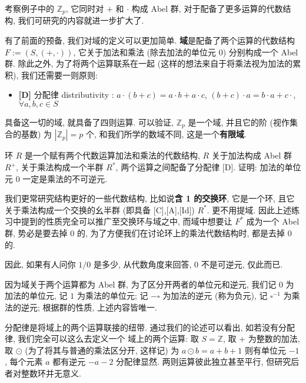 \documentclass[UTF8]{book}
\begin{document}
考察例子中的 $\mathbb{Z}_p$, 它同时对 $+$ 和 $\cdot$ 构成 
Abel 群, 对于配备了更多运算的代数结构, 
我们可研究的内容就进一步扩大了. 

有了前面的预备, 我们对域的定义可以更加简单. 
\textbf{域}是配备了两个运算的代数结构 $F := (S,(+,\cdot))$, 
它关于加法和乘法 (除去加法的单位元 0) 分别构成一个 Abel 群. 
除此之外, 为了将两个运算联系在一起 (这样的想法来自于将乘法视为加法的累积), 
我们还需要一则原则: 
\begin{itemize}
    \item \textbf{[D]} 分配律 distributivity : 
    $ a \cdot (b+c) = a \cdot b + a \cdot c$, 
    $ (b+c) \cdot a = b \cdot a + c \cdot $, 
    $ \forall a,b,c \in S$ 
\end{itemize}
具备这一切的域, 就具备了四则运算. 
可以验证, $\mathbb{Z}_p$ 是一个域, 
并且它的阶 (视作集合的基数) 为 $|\mathbb{Z}_p|=p$ 个, 
和我们所学的数域不同, 这是一个\textbf{有限域}. 

\begin{exercise}
    环 $R$ 是一个赋有两个代数运算加法和乘法的代数结构, 
    $R$ 关于加法构成 Abel 群 $R^+$, 
    关于乘法构成一个半群 $R^*$, 
    两个运算之间配备了分配律 [D]. 
    证明: 加法的单位元 $0$ 一定是乘法的不可逆元. 
\end{exercise}

我们更常研究结构更好的一些代数结构, 
比如说\textbf{含 1 的交换环}, 
它是一个环, 且它关于乘法构成一个交换的幺半群 
(即具备 [C],[A],[Id]) $R^*$. 更不用提域. 
因此上述练习中提到的性质完全可以推广至交换环与域之中, 
而域中想要让 $F^*$ 成为一个 Abel 群, 势必是要去掉 0 的, 
为了方便我们在讨论环上的乘法代数结构时, 都是去掉 0 的. 

\begin{remark}
    因此, 如果有人问你 $1/0$ 是多少, 从代数角度来回答, 
    $0$ 不是可逆元, 仅此而已. 
\end{remark}

因为域关于两个运算都为 Abel 群, 
为了区分开两者的单位元和逆元, 
我们记 $0$ 为加法的单位元, 记 $1$ 为乘法的单位元; 
记 $-\square$ 为加法的逆元 (称为负元), 记 $\square^{-1}$ 为乘法的逆元; 
根据群的性质, 上述内容皆唯一. 

\begin{remark}
    分配律是将域上的两个运算联接的纽带. 
    通过我们的论述可以看出, 如若没有分配律, 我们完全可以这么去定义一个
    域上的两个运算: 
    取 $S = \mathbb{Z}$, 取 $+$ 为整数的加法, 
    取 $\odot $ (为了将其与普通的乘法区分开, 这样记) 
    为 $a \odot b = a + b + 1 $ 则有单位元 $-1$, 
    每个元素 $a$ 都有逆元 $-a-2$ 分配律显然. 
    两则运算彼此独立甚至平行, 
    但研究后者对整数环并无意义.    
\end{remark}
\end{document}
